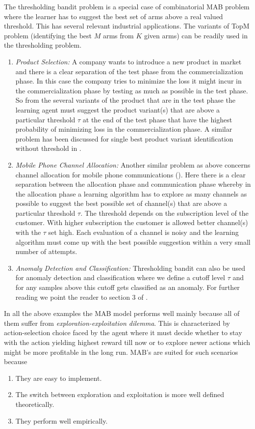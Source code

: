 	The thresholding bandit problem is a special case of combinatorial MAB problem where the learner has to suggest the best set of arms above a real valued threshold. This has several relevant industrial applications. The variants of TopM problem (identifying the best $M$ arms from $K$ given arms) can be readily used in the thresholding problem.

\begin{enumerate}
\item \emph{Product Selection:} A company wants to introduce a new product in market and there is a clear separation of the test phase from the commercialization phase. In this case the company tries to minimize the loss it might incur in the commercialization phase by testing as much as possible in the test phase. So from the several variants of the product that are in the test phase the learning agent must suggest the product variant(s) that are above a particular threshold $\tau$ at the end of the test phase that have the highest probability of minimizing loss in the commercialization phase. A similar problem has been discussed for single best product variant identification without threshold in \cite{bubeck2011pure}. 
\item \emph{Mobile Phone Channel Allocation:} Another similar problem as above concerns channel allocation for mobile phone communications (\cite{audibert2009exploration}). Here there is a clear separation between the allocation phase and communication phase whereby in the allocation phase a learning algorithm has to explore as many channels as possible to suggest the best possible set of channel(s) that are above a particular threshold $\tau$. The threshold depends on the subscription level of the customer. With higher subscription the customer is allowed better channel(s) with the $\tau$ set high. Each evaluation of a channel is noisy and the learning algorithm must come up with the best possible suggestion within a very small  number of attempts.
\item \emph{Anomaly Detection and Classification:} Thresholding bandit can also be used for anomaly detection and classification where we define a cutoff level $\tau$ and for any samples above this cutoff gets classified as an anomaly. For further reading we point the reader to section 3 of \cite{locatelli2016optimal}.
\end{enumerate}


	In all the above examples the MAB model performs well mainly because all of them suffer from \textit{exploration-exploitation dilemma}. This is characterized by action-selection choice faced by the agent where it must decide whether to stay with the action yielding highest reward till now or to explore newer actions which might be more profitable in the long run. MAB's are suited for such scenarios because 
\begin{enumerate}
\item They are easy to implement.
\item The switch between exploration and exploitation is more well defined theoretically.
\item They perform well empirically.
\end{enumerate}

